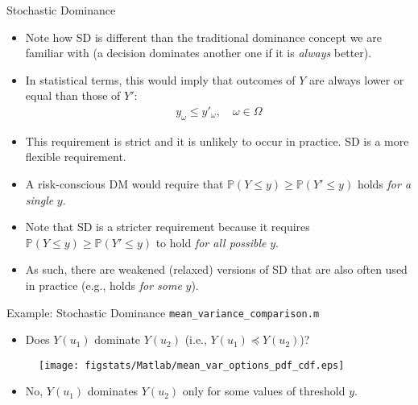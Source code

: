 \documentclass[9pt]{beamer}
\begin{document}
%
\begin{frame}{Stochastic Dominance}

\begin{itemize}
\setlength{\itemsep}{10pt}
\item Note how SD is different than the traditional dominance concept we are familiar with (a decision dominates another one if it is {\em always} better). 

\item In statistical terms, this would imply that outcomes of $Y$ are always lower or equal than those of $Y'$:
\begin{align*}
y_{\omega}\leq y'_\omega,\quad \omega \in \Omega
\end{align*}
\item This requirement is strict and it is unlikely to occur in practice. SD is a more flexible requirement. 
\item A risk-conscious DM would require that $\mathbb{P}(Y\leq y)\geq \mathbb{P}(Y'\leq y)$ holds {\em for a single} $y$. 

\item Note that SD is a stricter requirement because it requires $\mathbb{P}(Y\leq y)\geq \mathbb{P}(Y'\leq y)$ to hold {\em for all possible} $y$. 

\item As such, there are weakened (relaxed) versions of SD that are also often used in practice (e.g., holds {\em for some} $y$).  
\end{itemize}


\end{frame}

%
\begin{frame}{Example: Stochastic Dominance \footnotesize{\texttt{mean\_variance\_comparison.m}}}

\begin{itemize}
\item Does $Y(u_1)$ dominate $Y(u_2)$ (i.e., $Y(u_1)\preceq Y(u_2)$)? 
\end{itemize}
\begin{figure}[!htb]
    \centering
	\texttt{[image: figstats/Matlab/mean\_var\_options\_pdf\_cdf.eps]}
\end{figure}
\pause 
\begin{itemize}
\item No, $Y(u_1)$ dominates $Y(u_2)$ only for some values of threshold $y$.
\end{itemize}


\end{frame}
\end{document}
